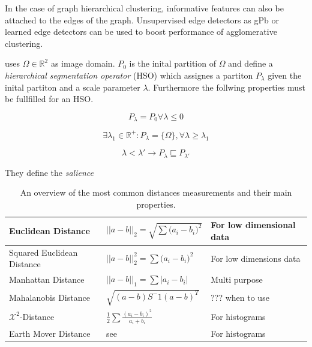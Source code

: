 In the case of graph hierarchical clustering, informative features
can also be attached to the edges of the graph.
Unsupervised edge detectors as gPb \citep{marie_2008_cvpr}  or learned
edge detectors \cite{dollar_2013_iccv}  can be used to boost performance
of agglomerative clustering.



\citet{ arbelaez_2006_cvpr} uses $\Omega \in \mathbb{R}^2$ as image domain.
$P_0$ is the inital partition of $\Omega$ and define a
\emph{hierarchical segmentation operator} (HSO) which
assignes a partiton $P_\lambda$ given the inital partiton and
a scale parameter $\lambda$.
Furthermore the follwing properties must be fullfilled for an HSO.  

\begin{equation} \label{ucm_hso_0}
P_{\lambda} = P_0 \forall \lambda \leq 0
\end{equation}

\begin{equation} \label{ucm_hso_1}
\exists \lambda_1 \in \mathbb{R}^+  : P_{\lambda} = \{ \Omega \} , \forall \lambda \geq \lambda_1
\end{equation}

\begin{equation} \label{ucm_hso_2}
\lambda < \lambda' \rightarrow P_{\lambda} \sqsubseteq   P_{\lambda'}
\end{equation}


They define the \emph{salience}


\begin{table}
\begin{scriptsize}
\begin{tabular}{ |l|l|p{5cm}|}
    \hline 
    Euclidean Distance
        & $||a-b||_2 = \sqrt{\sum{ (a_i-b_i })^2 } $
        & For low dimensional data \\  \hline 
    Squared Euclidean Distance
        & $||a-b||_2^2 = \sum{ (a_i-b_i })^2  $
        & For low dimensions data\\  \hline
    Manhattan Distance
        &  $||a-b||_1 = \sum{ |a_i-b_i |}  $
        & Multi purpose \\  \hline 
    Mahalanobis Distance 
        & $\sqrt{(a-b)S^-1(a-b)^T}$
        & ??? when to use \\  \hline 
    $\mathcal{X}^2$-Distance  
        &  $\frac{1}{2}\sum{  \frac{(a_i-b_i)^2}{a_i+b_i} }$
        & For histograms \\  \hline 
    Earth Mover  Distance          
        &  see \citet{levina_2001_iccv} 
        & For histograms \\  \hline 

\end{tabular}

\end{scriptsize}
\caption{
    An overview of the most common distances measurements and their main properties.
}\label{tab:hc_distance_types}
\end{table}



